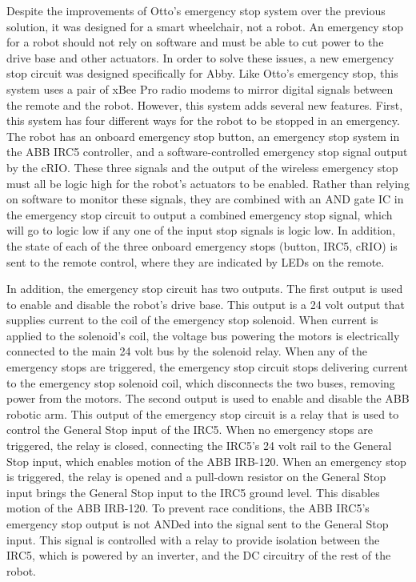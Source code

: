 \documentclass{cwru}
\begin{document}
Despite the improvements of Otto{\textquoteright}s emergency stop system over the previous solution, it was designed for a smart wheelchair, not a robot. An emergency stop for a robot should not rely on software and must be able to cut power to the drive base and other actuators. In order to solve these issues, a new emergency stop circuit was designed specifically for Abby. Like Otto{\textquoteright}s emergency stop, this system uses a pair of xBee Pro radio modems to mirror digital signals between the remote and the robot. However, this system adds several new features. First, this system has four different ways for the robot to be stopped in an emergency. The robot has an onboard emergency stop button, an emergency stop system in the ABB IRC5 controller, and a software-controlled emergency stop signal output by the cRIO. These three signals and the output of the wireless emergency stop must all be logic high for the robot{\textquoteright}s actuators to be enabled. Rather than relying on software to monitor these signals, they are combined with an AND gate IC in the emergency stop circuit to output a combined emergency stop signal, which will go to logic low if any one of the input stop signals is logic low. In addition, the state of each of the three onboard emergency stops (button, IRC5, cRIO) is sent to the remote control, where they are indicated by LEDs on the remote.

In addition, the emergency stop circuit has two outputs. The first output is used to enable and disable the robot{\textquoteright}s drive base. This output is a 24 volt output that supplies current to the coil of the emergency stop solenoid. When current is applied to the solenoid{\textquoteright}s coil, the voltage bus powering the motors is electrically connected to the main 24 volt bus by the solenoid relay. When any of the emergency stops are triggered, the emergency stop circuit stops delivering current to the emergency stop solenoid coil, which disconnects the two buses, removing power from the motors. The second output is used to enable and disable the ABB robotic arm. This output of the emergency stop circuit is a relay that is used to control the General Stop input of the IRC5. When no emergency stops are triggered, the relay is closed, connecting the IRC5{\textquoteright}s 24 volt rail to the General Stop input, which enables motion of the ABB IRB-120. When an emergency stop is triggered, the relay is opened and a pull-down resistor on the General Stop input brings the General Stop input to the IRC5 ground level. This disables motion of the ABB IRB-120. To prevent race conditions, the ABB IRC5{\textquoteright}s emergency stop output is not ANDed into the signal sent to the General Stop input. This signal is controlled with a relay to provide isolation between the IRC5, which is powered by an inverter, and the DC circuitry of the rest of the robot.
\end{document}
